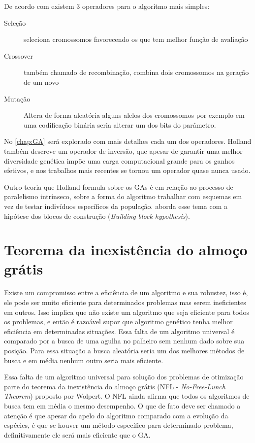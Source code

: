 De acordo com \citeauthor{Mitchell1996} existem 3 operadores para o algoritmo mais simples:
\begin{description}
	\item[Seleção] seleciona cromossomos favorecendo os que tem melhor função de avaliação
	\item[Crossover] também chamado de recombinação, combina dois cromossomos na geração de um novo
	\item[Mutação] Altera de forma aleatória alguns alelos dos cromossomos por exemplo em uma codificação binária seria alterar um dos bits do parâmetro.
\end{description}

No \autoref{chap:GA} será explorado com mais detalhes cada um dos operadores. Holland também descreve um operador de inversão, que apesar de garantir uma melhor diversidade genética impõe uma carga computacional grande para os ganhos efetivos, e nos trabalhos mais recentes se tornou um operador quase nunca usado.

Outro teoria que Holland formula sobre os GAs é em relação ao processo de paralelismo intrínseco, sobre a forma do algoritmo trabalhar com esquemas em vez de testar indivíduos específicos da população. \citeauthor{Goldberg1989} aborda esse tema com a hipótese dos blocos de construção (\textit{Building block hypothesis}).

\section {Teorema da inexistência do almoço grátis}
Existe um compromisso entre a eficiência de um algoritmo e sua robustez, isso é, ele pode ser muito eficiente para determinados problemas mas serem ineficientes em outros. Isso implica que não existe um algoritmo que seja eficiente para todos os problemas, e então é razoável supor que algoritmo genético tenha melhor eficiência em determinadas situações. Essa falta de um algoritmo universal é comparado por \citeauthor{Spall2003} a busca de uma agulha no palheiro sem nenhum dado sobre sua posição. Para essa situação a busca aleatória seria um dos melhores métodos de busca e em média nenhum outro seria mais eficiente.

Essa falta de um algoritmo universal para solução dos problemas de otimização parte do teorema da inexistência do almoço grátis (NFL - \textit{No-Free-Lunch Theorem}) proposto por Wolpert. O NFL ainda afirma que todos os algoritmos de busca tem em média o mesmo desempenho\cite{Linden2008}. O que de fato deve ser chamado a atenção é que apesar do apelo do algoritmo comparado com a evolução da espécies, é que se houver um método específico para determinado problema, definitivamente ele será mais eficiente que o GA.

